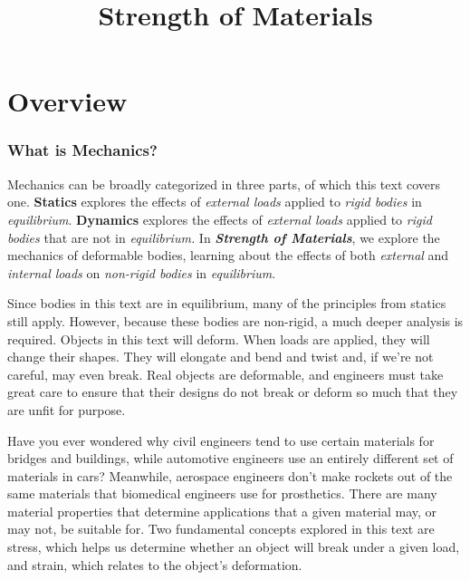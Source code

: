 \documentclass[
  letterpaper,
  DIV=11,
  numbers=noendperiod]{scrreprt}
\title{Strength of Materials}
\author{}
\date{}
\renewcommand*\contentsname{Table of contents}
\newcommand\contentsname{Table of contents}
\theoremstyle{definition}
\theoremstyle{remark}
\begin{document}
\maketitle

\renewcommand*\contentsname{Table of contents}
{
\hypersetup{linkcolor=}
\setcounter{tocdepth}{2}
\tableofcontents
}


\chapter*{Overview}\label{overview}


\subsection*{What is Mechanics?}\label{what-is-mechanics}

Mechanics can be broadly categorized in three parts, of which this text
covers one. \textbf{Statics} explores the effects of \emph{external
loads} applied to \emph{rigid bodies} in \emph{equilibrium}.
\textbf{Dynamics} explores the effects of \emph{external loads} applied
to \emph{rigid bodies} that are not in \emph{equilibrium.} In
\textbf{\emph{Strength of Materials}}, we explore the mechanics of
deformable bodies, learning about the effects of both \emph{external}
and \emph{internal loads} on \emph{non-rigid bodies} in
\emph{equilibrium}.

Since bodies in this text are in equilibrium, many of the principles
from statics still apply. However, because these bodies are non-rigid, a
much deeper analysis is required. Objects in this text will deform. When
loads are applied, they will change their shapes. They will elongate and
bend and twist and, if we're not careful, may even break. Real objects
are deformable, and engineers must take great care to ensure that their
designs do not break or deform so much that they are unfit for purpose.

Have you ever wondered why civil engineers tend to use certain materials
for bridges and buildings, while automotive engineers use an entirely
different set of materials in cars? Meanwhile, aerospace engineers don't
make rockets out of the same materials that biomedical engineers use for
prosthetics. There are many material properties that determine
applications that a given material may, or may not, be suitable for. Two
fundamental concepts explored in this text are stress, which helps us
determine whether an object will break under a given load, and strain,
which relates to the object's deformation.
\end{document}
